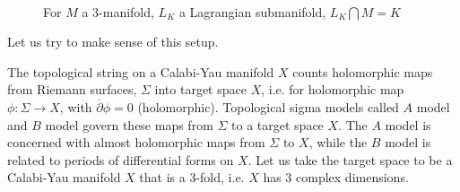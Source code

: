 \documentclass[a4paper,titlepage,twoside]{book}
\begin{document}
\begin{figure}[h]
\begin{center}
\quad \quad \quad \, 
\end{center}
\caption{For $M$ a 3-manifold, $L_K$ a Lagrangian submanifold, $L_K \bigcap M = K$} \label{Fig:topstringsetup00}
\end{figure}

Let us try to make sense of this setup.  

The topological string on a Calabi-Yau manifold $X$ counts holomorphic maps from Riemann surfaces, $\Sigma$ into target space $X$, i.e. for holomorphic map $\phi : \Sigma \to X$, with $\overline{\partial} \phi =0$ (holomorphic).    Topological sigma models called $A$ model and $B$ model govern these maps from $\Sigma$ to a target space $X$. The $A$ model is concerned with almost holomorphic maps from $\Sigma$ to $X$, while the $B$ model is related to periods of differential forms on $X$.   Let us take the target space to be a Calabi-Yau manifold $X$ that is a 3-fold, i.e. $X$ has 3 complex dimensions.
\end{document}
